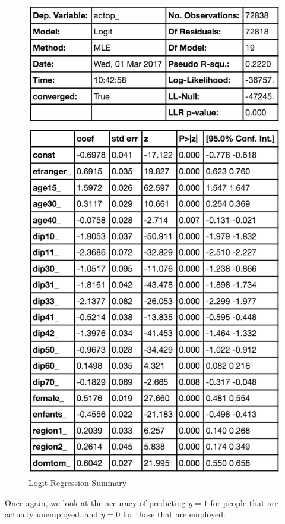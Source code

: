 \begin{figure}
    \centering
    \includegraphics[scale=0.4]{img/logit_regression_summary}
    \caption{Logit Regression Summary}
    \label{fig:logit_regression_summary}
\end{figure}

Once again, we look at the accuracy of predicting $y=1$ for people that are actually unemployed, and $y=0$ for those that are employed.

